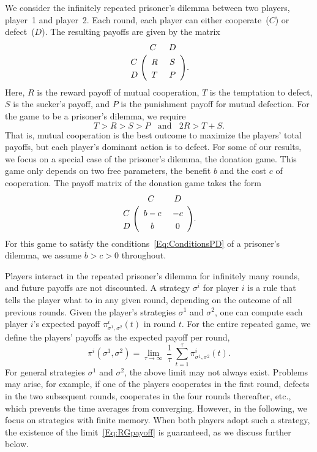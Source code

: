 \documentclass[11pt]{article}
\theoremstyle{plainCl1}
\theoremstyle{plainCl2}
\begin{document}
We consider the infinitely repeated prisoner's dilemma between two players, player~1 and player~2.
Each round, each player can either cooperate~($C$) or defect~($D$). 
The resulting payoffs are given by the matrix 
\begin{align}\label{Eq:PrisonerDilemma}
  \bordermatrix{%
    & C & D \cr
    C &\ R &\ S\  \cr
    D &\ T &\ P\ \cr
  }.
\end{align}
Here, $R$ is the reward payoff of mutual cooperation, $T$ is the temptation to defect, $S$ is the sucker's payoff, and $P$ is the punishment payoff for mutual defection. For the game to be a prisoner's dilemma, we require
\begin{equation} \label{Eq:ConditionsPD}
 T > R > S > P ~~~~\text{and}~~~~ 2 R > T \!+\! S. 
\end{equation}
That is, mutual cooperation is the best outcome to maximize the players' total payoffs, but each player's dominant action is to defect. 
For some of our results, we focus on a special case of the prisoner's dilemma, the donation game. 
This game only depends on two free parameters, the benefit $b$ and the cost $c$ of cooperation. 
The payoff matrix of the donation game takes the form
\begin{align} \label{Eq:DonationGame}
  \bordermatrix{%
    & C & D \cr
    C &\ b - c &\ -c\  \cr
    D &\ b &\ 0\ \cr
  }.
\end{align}
For this game to satisfy the conditions~\eqref{Eq:ConditionsPD} of a prisoner's dilemma, we assume $b\!>\!c\!>\!0$ throughout. 

Players interact in the repeated prisoner's dilemma for infinitely many rounds, and future payoffs are not discounted. 
A strategy $\sigma^i$ for player $i$ is a rule that tells the player what to in any given round, depending on the outcome of all previous rounds. 
Given the player's strategies $\sigma^1$ and $\sigma^2$, one can compute each player $i$'s expected payoff $\pi^i_{\sigma^1,\sigma^2}(t)$ in round $t$. 
For the entire repeated game, we define the players' payoffs as the expected payoff per round, 
\begin{equation} \label{Eq:RGpayoff}
\pi^i(\sigma^1,\sigma^2) = \lim_{\tau \to \infty}~ \frac{1}{\tau} ~\sum_{t=1}^{\tau} \pi_{\sigma^1,\sigma^2}^i(t).
\end{equation}
For general strategies $\sigma^1$ and $\sigma^2$, the above limit may not always exist. 
Problems may arise, for example, if one of the players cooperates in the first round, defects in the two subsequent rounds, cooperates in the four rounds thereafter, etc., which prevents the time averages from converging. 
However, in the following, we focus on strategies with finite memory. 
When both players adopt such a strategy, the existence of the limit~\eqref{Eq:RGpayoff} is guaranteed, as we discuss further below.
\end{document}
